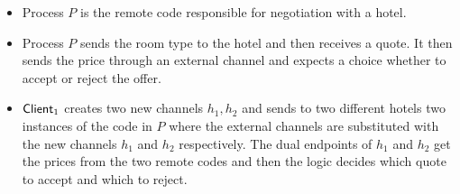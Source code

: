 \begin{itemize}
	\item	Process $P$ is the remote code responsible for negotiation with a hotel.
	\item	Process $P$ sends the room type to the hotel and then receives a quote.
		It then sends the price through an external channel and expects a choice
		whether to accept or reject the offer.

	\item	$\mathsf{Client}_1$ creates two new channels $h_1, h_2$ and sends to two
		different hotels two instances of the code in $P$ where the external
		channels are substituted with the new channels $h_1$ and $h_2$ respectively.
		The dual endpoints of $h_1$ and $h_2$ get the prices from the two
		remote codes and then the logic decides which quote to accept and which to reject.
\end{itemize}
